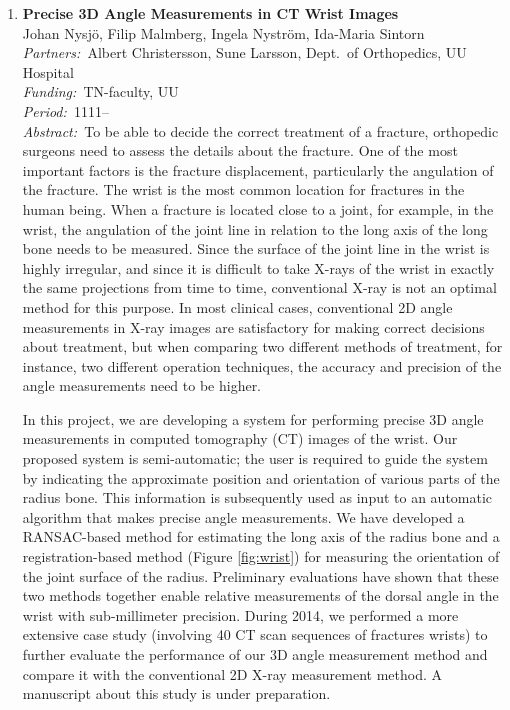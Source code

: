 \documentclass[10pt, a4paper]{article}
\newcommand{\aabstract}[1]{\emph{Abstract:~}#1}
\newcommand{\ffunding}[1]{\emph{Funding:~}#1\\}
\newcommand{\ppartners}[1]{\emph{Partners:~}#1\\}
\newcommand{\pperiod}[1]{\emph{Period:~}#1\\}
\begin{document}
{\begin{enumerate}
\item 
\label{project:wrist_angle_measurements}
\textbf{Precise 3D Angle Measurements in CT Wrist Images}\\
Johan Nysj{\"o}, Filip Malmberg, Ingela Nystr{\"o}m, Ida-Maria Sintorn\\
\ppartners{Albert Christersson, Sune Larsson, Dept.~of Orthopedics, UU Hospital}
\ffunding{TN-faculty, UU}
\pperiod{1111--}
\aabstract{To be able to decide the correct treatment of a fracture, orthopedic surgeons need to assess the details about the fracture. One of the most important factors is the fracture displacement, particularly the angulation of the fracture. The wrist is the most common location for fractures in the human being. When a fracture is located close to a joint, for example, in the wrist,  the angulation of the joint line in relation to the long axis of the long bone needs to be measured. Since the surface of the joint line in the wrist is highly irregular, and since it is difficult to take X-rays of the wrist in exactly the same projections from time to time, conventional X-ray is not an optimal method for this purpose. In most clinical cases, conventional 2D angle measurements in X-ray images are satisfactory for making correct decisions about treatment, but when comparing two different methods of treatment, for instance, two different operation techniques, the accuracy and precision of the angle measurements need to be higher.

In this project, we are developing a system for performing precise 3D angle measurements in computed tomography (CT) images of the wrist. Our proposed system is semi-automatic; the user is required to guide the system by indicating the approximate position and orientation of various parts of the radius bone. This information is subsequently used as input to an automatic algorithm that makes precise angle measurements. We have developed a RANSAC-based method for estimating the long axis of the radius bone and a registration-based method (Figure \ref{fig:wrist}) for measuring the orientation of the joint surface of the radius. Preliminary evaluations have shown that these two methods together enable relative measurements of the dorsal angle in the wrist with sub-millimeter precision. During 2014, we performed a more extensive case study (involving 40 CT scan sequences of fractures wrists) to further evaluate the performance of our 3D angle measurement method and compare it with the conventional 2D X-ray measurement method. A manuscript about this study is under preparation.}


\end{enumerate}}
\end{document}
